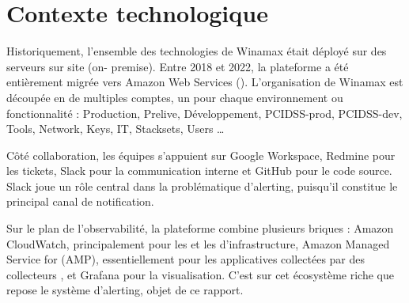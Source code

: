 \section{Contexte technologique}

Historiquement, l'ensemble des technologies de Winamax était déployé sur des serveurs sur site (on-
premise). Entre 2018 et 2022, la plateforme a été entièrement migrée vers Amazon Web Services
().  L'organisation  de Winamax est découpée en de multiples comptes, un pour chaque environnement ou fonctionnalité : Production,
Prelive, Développement, PCIDSS-prod, PCIDSS-dev, Tools, Network, Keys, IT, Stacksets, Users \ldots

Côté collaboration, les équipes s'appuient sur Google Workspace, Redmine pour les tickets, Slack pour la communication interne et GitHub pour le code
source. Slack joue un rôle central dans la problématique d'alerting, puisqu'il constitue le principal
canal de notification.

Sur le plan de l'observabilité, la plateforme combine plusieurs briques : Amazon CloudWatch, principalement pour les
 et les  d'infrastructure, Amazon Managed Service for  (AMP), essentiellement pour les
 applicatives collectées par des collecteurs , et Grafana pour la visualisation.
C'est sur cet écosystème riche que repose le système d'alerting, objet de ce rapport.


